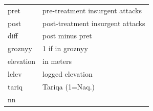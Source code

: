 \documentclass[]{article}
\theoremstyle{definition}
\theoremstyle{definition}
\theoremstyle{definition}
\theoremstyle{remark}
\begin{document}
\begin{longtable}[]{@{}ll@{}}
\begin{minipage}[t]{0.12\columnwidth}\raggedright\strut
pret\strut
\end{minipage} & \begin{minipage}[t]{0.50\columnwidth}\raggedright\strut
pre-treatment insurgent attacks\strut
\end{minipage}\tabularnewline
\begin{minipage}[t]{0.12\columnwidth}\raggedright\strut
post\strut
\end{minipage} & \begin{minipage}[t]{0.50\columnwidth}\raggedright\strut
post-treatment insurgent attacks\strut
\end{minipage}\tabularnewline
\begin{minipage}[t]{0.12\columnwidth}\raggedright\strut
diff\strut
\end{minipage} & \begin{minipage}[t]{0.50\columnwidth}\raggedright\strut
post minus pret\strut
\end{minipage}\tabularnewline
\begin{minipage}[t]{0.12\columnwidth}\raggedright\strut
groznyy\strut
\end{minipage} & \begin{minipage}[t]{0.50\columnwidth}\raggedright\strut
1 if in groznyy\strut
\end{minipage}\tabularnewline
\begin{minipage}[t]{0.12\columnwidth}\raggedright\strut
elevation\strut
\end{minipage} & \begin{minipage}[t]{0.50\columnwidth}\raggedright\strut
in meters\strut
\end{minipage}\tabularnewline
\begin{minipage}[t]{0.12\columnwidth}\raggedright\strut
lelev\strut
\end{minipage} & \begin{minipage}[t]{0.50\columnwidth}\raggedright\strut
logged elevation\strut
\end{minipage}\tabularnewline
\begin{minipage}[t]{0.12\columnwidth}\raggedright\strut
tariq\strut
\end{minipage} & \begin{minipage}[t]{0.50\columnwidth}\raggedright\strut
Tariqa (1=Naq.)\strut
\end{minipage}\tabularnewline
\begin{minipage}[t]{0.12\columnwidth}\raggedright\strut
nn\strut

\end{minipage}
\end{longtable}
\end{document}
